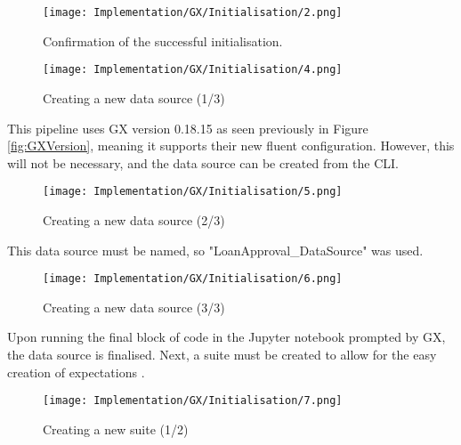 \begin{figure}[H]
    \centering
    \texttt{[image: Implementation/GX/Initialisation/2.png]}
    \caption{Confirmation of the successful initialisation.}
    \label{fig:GXInitConfirm}
\end{figure}


\begin{figure}[H]
    \centering
    \texttt{[image: Implementation/GX/Initialisation/4.png]}
    \caption{Creating a new data source (1/3)}
    \label{fig:GXDatasource1}
\end{figure}

\para This pipeline uses GX version 0.18.15 as seen previously in Figure \ref{fig:GXVersion},
meaning it supports their new fluent configuration. However, this will not be necessary,
and the data source can be created from the CLI.

\begin{figure}[H]
    \centering
    \texttt{[image: Implementation/GX/Initialisation/5.png]}
    \caption{Creating a new data source (2/3)}
    \label{fig:GXDatasource2}
\end{figure}

\para This data source must be named, so "LoanApproval\_DataSource" was used.

\begin{figure}[H]
    \centering
    \texttt{[image: Implementation/GX/Initialisation/6.png]}
    \caption{Creating a new data source (3/3)}
    \label{fig:GXDatasource3}
\end{figure}

\para Upon running the final block of code in the Jupyter notebook prompted by 
GX, the data source is finalised. Next, a suite must be created to allow for the easy creation of expectations \autocite{gx_expectation_nodate}.

\begin{figure}[H]
    \centering
    \texttt{[image: Implementation/GX/Initialisation/7.png]}
    \caption{Creating a new suite (1/2)}
    \label{fig:GXSuite1}
\end{figure}

